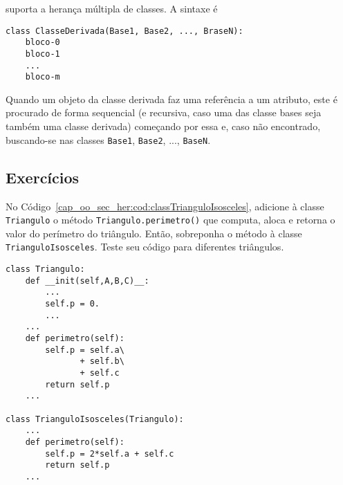 \begin{obs}
  {\python} suporta a herança múltipla de classes. A sintaxe é

\begin{lstlisting}
class ClasseDerivada(Base1, Base2, ..., BraseN):
    bloco-0
    bloco-1
    ...
    bloco-m
\end{lstlisting}
  
Quando um objeto da classe derivada faz uma referência a um atributo, este é procurado de forma sequencial (e recursiva, caso uma das classe bases seja também uma classe derivada) começando por essa e, caso não encontrado, buscando-se nas classes \lstinline+Base1+, \lstinline+Base2+, ..., \lstinline+BaseN+.
\end{obs}

\subsection{Exercícios}

\begin{exer}
  No Código~\ref{cap_oo_sec_her:cod:classTrianguloIsosceles}, adicione à classe \lstinline+Triangulo+ o método \lstinline+Triangulo.perimetro()+ que computa, aloca e retorna o valor do perímetro do triângulo. Então, sobreponha o método à classe \lstinline+TrianguloIsosceles+. Teste seu código para diferentes triângulos.
\end{exer}
\begin{resp}

\begin{lstlisting}
class Triangulo:
    def __init(self,A,B,C)__:
        ...
        self.p = 0.
        ...
    ...
    def perimetro(self):
        self.p = self.a\
               + self.b\
               + self.c
        return self.p
    ...

class TrianguloIsosceles(Triangulo):
    ...
    def perimetro(self):
        self.p = 2*self.a + self.c
        return self.p
    ...
\end{lstlisting}

\end{resp}

